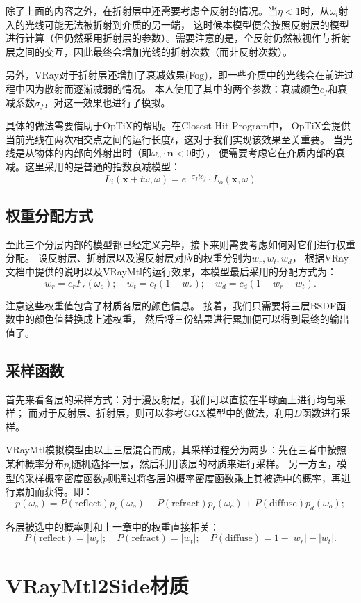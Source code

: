 除了上面的内容之外，在折射层中还需要考虑全反射的情况。当$\eta<1$时，从$\omega_i$射入的光线可能无法被折射到介质的另一端，
这时候本模型便会按照反射层的模型进行计算（但仍然采用折射层的参数）。需要注意的是，全反射仍然被视作与折射层之间的交互，因此最终会增加光线的折射次数（而非反射次数）。

另外，VRay对于折射层还增加了衰减效果(Fog)，即一些介质中的光线会在前进过程中因为散射而逐渐减弱的情况。
本人使用了其中的两个参数：衰减颜色$c_f$和衰减系数$\sigma_f$，对这一效果也进行了模拟。

具体的做法需要借助于OpTiX的帮助。在Closest Hit Program中，
OpTiX会提供当前光线在两次相交点之间的运行长度$t$，这对于我们实现该效果至关重要。
当光线是从物体的内部向外射出时（即$\omega_o\cdot \textbf{n} < 0$时），
便需要考虑它在介质内部的衰减。这里采用的是普通的指数衰减模型：
\begin{equation}
   L_i(\textbf{x}+t\omega, \omega) = e^{-\sigma_f t c_f}\cdot L_o(\textbf{x}, \omega) 
\end{equation}

\subsection{权重分配方式}

至此三个分层内部的模型都已经定义完毕，接下来则需要考虑如何对它们进行权重分配。
设反射层、折射层以及漫反射层对应的权重分别为$w_r, w_t, w_d$，
根据VRay文档中提供的说明以及VRayMtl的运行效果，本模型最后采用的分配方式为：
\begin{equation}
w_r = c_rF_r(\omega_o) ; \quad w_t = c_t(1-w_r) ; \quad w_d = c_d(1-w_r-w_t).
\end{equation}

注意这些权重值包含了材质各层的颜色信息。
接着，我们只需要将三层BSDF函数中的颜色值替换成上述权重，
然后将三份结果进行累加便可以得到最终的输出值了。

\subsection{采样函数}

首先来看各层的采样方式：对于漫反射层，我们可以直接在半球面上进行均匀采样；
而对于反射层、折射层，则可以参考GGX模型中的做法，利用$D$函数进行采样。

VRayMtl模拟模型由以上三层混合而成，其采样过程分为两步：先在三者中按照某种概率分布$p_{l}$随机选择一层，然后利用该层的材质来进行采样。
另一方面，模型的采样概率密度函数$p$则通过将各层的概率密度函数乘上其被选中的概率，再进行累加而获得。即：
\begin{equation}
p(\omega_o) = P(\text{reflect})p_r(\omega_o)+P(\text{refract})p_t(\omega_o)+P(\text{diffuse})p_d(\omega_o);
\end{equation}

各层被选中的概率则和上一章中的权重直接相关：
\begin{equation}
    P(\text{reflect}) = |w_r|; \quad P(\text{refract}) = |w_t|; \quad P(\text{diffuse}) = 1-|w_r|-|w_t|.
\end{equation}
    

\section{VRayMtl2Side材质}

